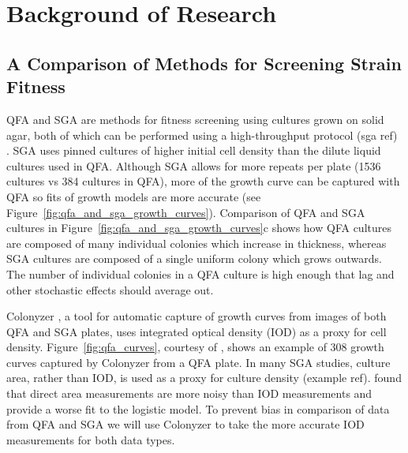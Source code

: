 \graphicspath{{images_low_res/}}

\section{Background of Research}
\label{sec:background}

\subsection{A Comparison of Methods for Screening Strain Fitness }

QFA and SGA are methods for fitness screening using cultures grown on solid agar, both of
which can be performed using a high-throughput protocol (sga ref) \cite{Banks2012}. SGA
uses pinned cultures of higher initial cell density than the dilute liquid cultures used
in QFA. Although SGA allows for more repeats per plate (1536 cultures vs 384 cultures in
QFA), more of the growth curve can be captured with QFA so fits of growth models are more
accurate (see Figure~\ref{fig:qfa_and_sga_growth_curves}).
Comparison of QFA and SGA cultures in Figure~\ref{fig:qfa_and_sga_growth_curves}c shows
how QFA cultures are composed of many individual colonies which increase in thickness,
whereas SGA cultures are composed of a single uniform colony which grows outwards. The
number of individual colonies in a QFA culture is high enough that lag and other
stochastic effects should average out.

Colonyzer \citep{Lawless2010}, a tool for automatic capture of growth curves from images
of both QFA and SGA plates, uses integrated optical density (IOD) as a proxy for cell
density. Figure~\ref{fig:qfa_curves}, courtesy of \citet{Banks2012}, shows an example of
308 growth curves captured by Colonyzer from a QFA plate. In many SGA studies, culture
area, rather than IOD, is used as a proxy for culture density (example
ref). \cite{Lawless2010} found that direct area measurements are more noisy than IOD
measurements and provide a worse fit to the logistic model. To prevent bias in comparison
of data from QFA and SGA we will use Colonyzer to take the more accurate IOD measurements
for both data types.

